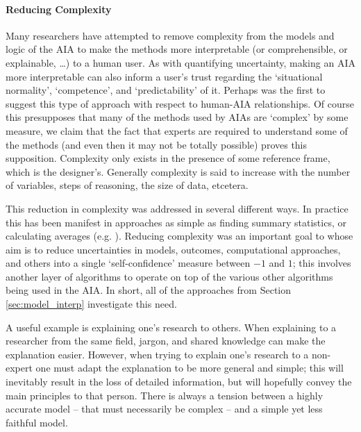     \paragraph{Reducing Complexity} Many researchers have attempted to remove complexity from the models and logic of the AIA to make the methods more interpretable (or comprehensible, or explainable, \ldots) to a human user. 
    As with quantifying uncertainty, making an AIA more interpretable can also inform a user's trust regarding the `situational normality', `competence', and `predictability' of it. Perhaps \cite{Sheridan1984-kx} was the first to suggest this type of approach with respect to human-AIA relationships. Of course this presupposes that many of the methods used by AIAs are `complex' by some measure, we claim that the fact that experts are required to understand some of the methods (and even then it may not be totally possible) proves this supposition. Complexity only exists in the presence of some reference frame, which is the designer's. Generally complexity is said to increase with the number of variables, steps of reasoning, the size of data, etcetera.

    This reduction in complexity was addressed in several different ways. In practice this has been manifest in approaches as simple as finding summary statistics, or calculating averages (e.g. \cite{Muir1994-ow,Muir1996-gt}). Reducing complexity was an important goal to \cite{Aitken2016-fb} whose aim is to reduce uncertainties in models, outcomes, computational approaches, and others into a single `self-confidence' measure between $-1$ and $1$; this involves another layer of algorithms to operate on top of the various other algorithms being used in the AIA. In short, all of the approaches from Section \ref{sec:model_interp} investigate this need. 

    A useful example is explaining one's research to others. When explaining to a researcher from the same field, jargon, and shared knowledge can make the explanation easier. However, when trying to explain one's research to a non-expert one must adapt the explanation to be more general and simple; this will inevitably result in the loss of detailed information, but will hopefully convey the main principles to that person. There is always a tension between a highly accurate model -- that must necessarily be complex -- and a simple yet less faithful model. 

